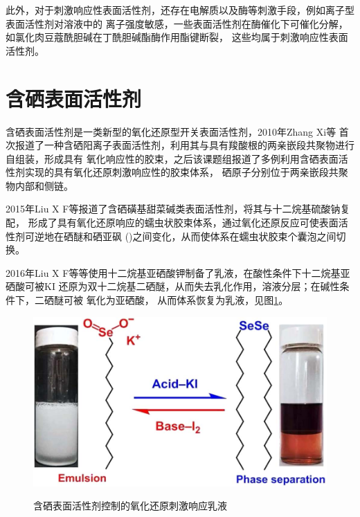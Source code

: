 \documentclass[bachelor,winfonts,replaceperiod]{jnuthesis}
\begin{document}
    此外，对于刺激响应性表面活性剂，还存在电解质以及酶等刺激手段，例如离子型表面活性剂对溶液中的
    离子强度敏感，一些表面活性剂在酶催化下可催化分解，如氯化肉豆蔻酰胆碱在丁酰胆碱酯酶作用酯键断裂\cite{guo2012}，
    这些均属于刺激响应性表面活性剂。
    
%    
    
    
    \section{含硒表面活性剂}
    含硒表面活性剂是一类新型的氧化还原型开关表面活性剂，2010年Zhang Xi等\cite{zhangxi2010,zhangxi20102}
    首次报道了一种含硒阳离子表面活性剂，利用其与具有羧酸根的两亲嵌段共聚物进行自组装，形成具有
    氧化响应性的胶束，之后该课题组报道了多例利用含硒表面活性剂实现的具有氧化还原刺激响应性的胶束体系，
    硒原子分别位于两亲嵌段共聚物内部和侧链。
    
    2015年Liu X F等\cite{zhang2015}报道了含硒磺基甜菜碱类表面活性剂，将其与十二烷基硫酸钠复配，
    形成了具有氧化还原响应的蠕虫状胶束体系，通过氧化还原反应可使表面活性剂可逆地在硒醚和硒亚砜
    ()之间变化，从而使体系在蠕虫状胶束个囊泡之间切换。
    
    2016年Liu X F等\cite{zhang2016}等使用十二烷基亚硒酸钾制备了乳液，在酸性条件下十二烷基亚硒酸可被KI
    还原为双十二烷基二硒醚，从而失去乳化作用，溶液分层；在碱性条件下，二硒醚可被 氧化为亚硒酸，
    从而体系恢复为乳液，见图\ref{fig:switchable-selenium}。 
    \begin{figure}[htbp]
        \centering
        \includegraphics[scale=0.8]{figure/switchable-selenium.jpg}\\
        \caption{含硒表面活性剂控制的氧化还原刺激响应乳液\cite{zhang2016}}\label{fig:switchable-selenium}
    \end{figure}
\end{document}
